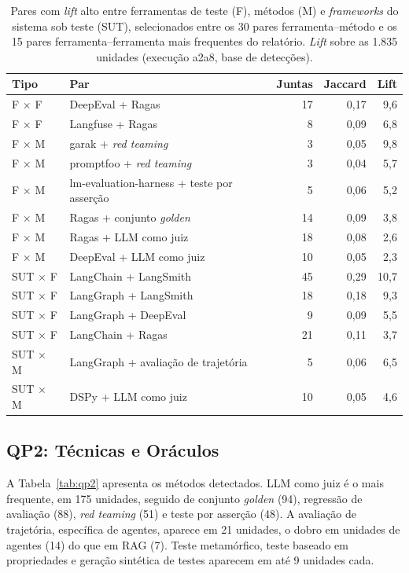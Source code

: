 \documentclass[sigconf]{acmart}
\begin{document}
\begin{table}[t]
  \caption{Pares com \textit{lift} alto entre ferramentas de teste (F), métodos (M) e \textit{frameworks} do sistema sob teste (SUT), selecionados entre os 30 pares ferramenta--método e os 15 pares ferramenta--ferramenta mais frequentes do relatório. \textit{Lift} sobre as 1.835 unidades (execução a2a8, base de detecções).}
  \label{tab:pares}
  \small
  \begin{tabular}{llrrr}
    \toprule
    Tipo & Par & Juntas & Jaccard & Lift \\
    \midrule
    F $\times$ F & DeepEval + Ragas & 17 & 0,17 & 9,6 \\
    F $\times$ F & Langfuse + Ragas & 8 & 0,09 & 6,8 \\
    F $\times$ M & garak + \textit{red teaming} & 3 & 0,05 & 9,8 \\
    F $\times$ M & promptfoo + \textit{red teaming} & 3 & 0,04 & 5,7 \\
    F $\times$ M & lm-evaluation-harness + teste por asserção & 5 & 0,06 & 5,2 \\
    F $\times$ M & Ragas + conjunto \textit{golden} & 14 & 0,09 & 3,8 \\
    F $\times$ M & Ragas + LLM como juiz & 18 & 0,08 & 2,6 \\
    F $\times$ M & DeepEval + LLM como juiz & 10 & 0,05 & 2,3 \\
    SUT $\times$ F & LangChain + LangSmith & 45 & 0,29 & 10,7 \\
    SUT $\times$ F & LangGraph + LangSmith & 18 & 0,18 & 9,3 \\
    SUT $\times$ F & LangGraph + DeepEval & 9 & 0,09 & 5,5 \\
    SUT $\times$ F & LangChain + Ragas & 21 & 0,11 & 3,7 \\
    SUT $\times$ M & LangGraph + avaliação de trajetória & 5 & 0,06 & 6,5 \\
    SUT $\times$ M & DSPy + LLM como juiz & 10 & 0,05 & 4,6 \\
    \bottomrule
  \end{tabular}
\end{table}

\subsection{QP2: Técnicas e Oráculos}

A Tabela~\ref{tab:qp2} apresenta os métodos detectados. LLM como juiz é o mais frequente, em 175 unidades, seguido de conjunto \textit{golden} (94), regressão de avaliação (88), \textit{red teaming} (51) e teste por asserção (48). A avaliação de trajetória, específica de agentes, aparece em 21 unidades, o dobro em unidades de agentes (14) do que em RAG (7). Teste metamórfico, teste baseado em propriedades e geração sintética de testes aparecem em até 9 unidades cada.
\end{document}
